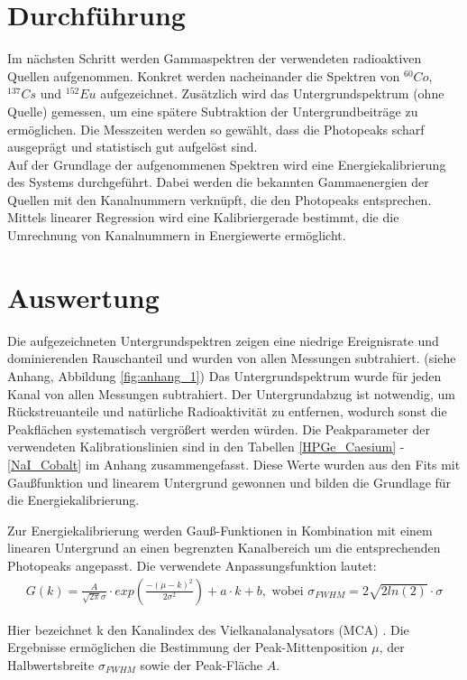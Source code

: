 \section{Durchführung}
Im nächsten Schritt werden Gammaspektren der verwendeten radioaktiven Quellen aufgenommen. Konkret werden nacheinander die Spektren von $^{60}Co$, $^{137}Cs$ und $^{152}Eu$ aufgezeichnet. Zusätzlich wird das Untergrundspektrum (ohne Quelle) gemessen, um eine spätere Subtraktion der Untergrundbeiträge zu ermöglichen. Die Messzeiten werden so gewählt, dass die Photopeaks scharf ausgeprägt und statistisch gut aufgelöst sind.\\

Auf der Grundlage der aufgenommenen Spektren wird eine Energiekalibrierung des Systems durchgeführt. Dabei werden die bekannten Gammaenergien der Quellen mit den Kanalnummern verknüpft, die den Photopeaks entsprechen. Mittels linearer Regression wird eine Kalibriergerade bestimmt, die die Umrechnung von Kanalnummern in Energiewerte ermöglicht.

\section{Auswertung}
Die aufgezeichneten Untergrundspektren zeigen eine niedrige Ereignisrate und dominierenden Rauschanteil und wurden von allen Messungen subtrahiert. (siehe Anhang, Abbildung \ref{fig:anhang_1})
Das Untergrundspektrum wurde für jeden Kanal von allen Messungen subtrahiert. Der Untergrundabzug ist notwendig, um Rückstreuanteile und natürliche Radioaktivität zu entfernen, wodurch sonst die Peakflächen systematisch vergrößert werden würden.
Die Peakparameter der verwendeten Kalibrationslinien sind in den Tabellen \ref{HPGe_Caesium}%
-\ref{NaI_Cobalt} im Anhang zusammengefasst. Diese Werte wurden aus den Fits mit Gaußfunktion und linearem Untergrund gewonnen und bilden die Grundlage für die Energiekalibrierung.

Zur Energiekalibrierung werden Gauß-Funktionen in Kombination mit einem linearen Untergrund an einen begrenzten Kanalbereich um die entsprechenden Photopeaks angepasst. Die verwendete Anpassungsfunktion lautet:
\begin{align}
    G(k) = \frac{A}{\sqrt{2\pi}\sigma}\cdot exp(\frac{-(\mu-k)^2}{2\sigma^2})+a\cdot k +b,\text{ wobei }\sigma_{FWHM}=2\sqrt{2ln(2)}\cdot\sigma
\end{align}
\label{eq_1}

Hier bezeichnet  k den Kanalindex des Vielkanalanalysators (MCA) . Die Ergebnisse ermöglichen die Bestimmung der Peak-Mittenposition $\mu$, der Halbwertsbreite  $\sigma_{FWHM}$ sowie der Peak-Fläche $A$. 

